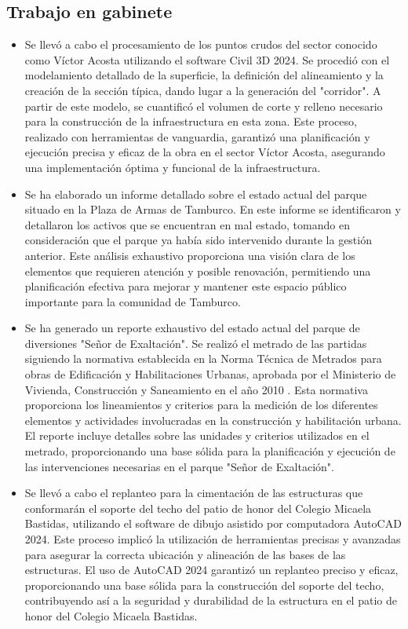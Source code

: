\subsection{Trabajo en gabinete}
\begin{itemize}
	\item Se llevó a cabo el procesamiento de los puntos crudos del sector conocido como Víctor Acosta utilizando el software Civil 3D 2024. Se procedió con el modelamiento detallado de la superficie, la definición del alineamiento y la creación de la sección típica, dando lugar a la generación del "corridor". A partir de este modelo, se cuantificó el volumen de corte y relleno necesario para la construcción de la infraestructura en esta zona. Este proceso, realizado con herramientas de vanguardia, garantizó una planificación y ejecución precisa y eficaz de la obra en el sector Víctor Acosta, asegurando una implementación óptima y funcional de la infraestructura.
	\item Se ha elaborado un informe detallado sobre el estado actual del parque situado en la Plaza de Armas de Tamburco. En este informe se identificaron y detallaron los activos que se encuentran en mal estado, tomando en consideración que el parque ya había sido intervenido durante la gestión anterior. Este análisis exhaustivo proporciona una visión clara de los elementos que requieren atención y posible renovación, permitiendo una planificación efectiva para mejorar y mantener este espacio público importante para la comunidad de Tamburco.
	\item Se ha generado un reporte exhaustivo del estado actual del parque de diversiones "Señor de Exaltación". Se realizó el metrado de las partidas siguiendo la normativa establecida en la Norma Técnica de Metrados para obras de Edificación y Habilitaciones Urbanas, aprobada por el Ministerio de Vivienda, Construcción y Saneamiento en el año 2010 \cite{MVCS2010}. Esta normativa proporciona los lineamientos y criterios para la medición de los diferentes elementos y actividades involucradas en la construcción y habilitación urbana. El reporte incluye detalles sobre las unidades y criterios utilizados en el metrado, proporcionando una base sólida para la planificación y ejecución de las intervenciones necesarias en el parque "Señor de Exaltación".
	\item Se llevó a cabo el replanteo para la cimentación de las estructuras que conformarán el soporte del techo del patio de honor del Colegio Micaela Bastidas, utilizando el software de dibujo asistido por computadora AutoCAD 2024. Este proceso implicó la utilización de herramientas precisas y avanzadas para asegurar la correcta ubicación y alineación de las bases de las estructuras. El uso de AutoCAD 2024 garantizó un replanteo preciso y eficaz, proporcionando una base sólida para la construcción del soporte del techo, contribuyendo así a la seguridad y durabilidad de la estructura en el patio de honor del Colegio Micaela Bastidas.

\end{itemize}
